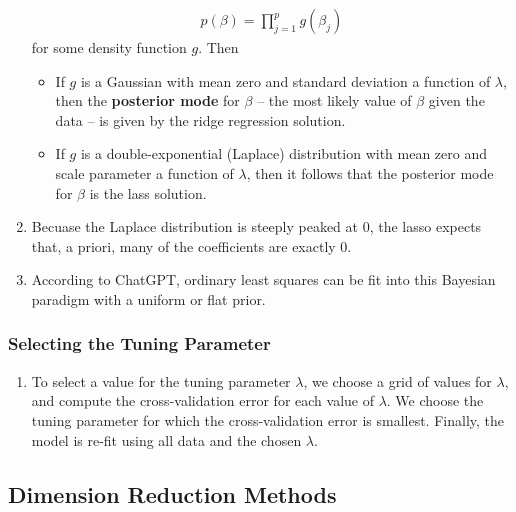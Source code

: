 \documentclass[10pt]{article}
\begin{document}
\begin{enumerate}
	\begin{align*}
		p(\beta) = \prod_{j = 1}^p g(\beta_j) 
	\end{align*}
	for some density function $g$.   Then \begin{itemize}
		\item If $g$ is a Gaussian with mean zero and standard deviation a function of $\lambda$, then the \textbf{posterior mode} for $\beta$ -- the most likely value of $\beta$ given the data -- is given by the ridge regression solution.  
		\item If $g$ is a double-exponential (Laplace) distribution with mean zero and scale parameter a function of $\lambda$, then it follows that the posterior mode for $\beta$ is the lass solution.  
	\end{itemize}
	\item Becuase the Laplace distribution is steeply peaked at 0, the lasso expects that, a priori, many of the coefficients are exactly 0.
	\item {\color{brown} According to ChatGPT, ordinary least squares can be fit into this Bayesian paradigm with a uniform or flat prior.}
\end{enumerate}

\subsubsection{Selecting the Tuning Parameter} 

\begin{enumerate}
	\item To select a value for the tuning parameter $\lambda$, we choose a grid of values for $\lambda$, and compute the cross-validation error for each value of $\lambda$.  We choose the tuning parameter for which the cross-validation error is smallest.  Finally, the model is re-fit using all data and the chosen $\lambda$.
\end{enumerate}

\subsection{Dimension Reduction Methods} 
\end{document}
